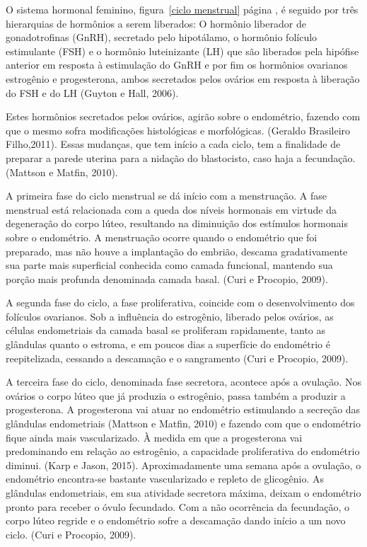 \documentclass[12pt]{article} %
\begin{document}
O sistema hormonal feminino, figura~\ref{ciclo menstrual} página
\pageref{ciclo menstrual}, é seguido por três hierarquias de hormônios
a serem liberados: O hormônio liberador de gonadotrofinas (GnRH),
secretado pelo hipotálamo, o hormônio folículo estimulante (FSH) e o
hormônio luteinizante (LH) que são liberados pela hipófise anterior
em resposta à estimulação do GnRH e por fim os hormônios ovarianos
estrogênio e progesterona, ambos secretados pelos ovários em resposta
à liberação do FSH e do LH (Guyton e Hall, 2006).


Estes hormônios secretados pelos ovários, agirão sobre o endométrio,
fazendo com que o mesmo sofra modificações histológicas e
morfológicas.  (Geraldo Brasileiro Filho,2011).  Essas mudanças, que
tem início a cada ciclo, tem a finalidade de preparar a parede uterina
para a nidação do blastocisto, caso haja a fecundação. (Mattson e
Matfin, 2010).


A primeira fase do ciclo menstrual se dá início com a menstruação. A
fase menstrual está relacionada com a queda dos níveis hormonais em
virtude da degeneração do corpo lúteo, resultando na diminuição dos
estímulos hormonais sobre o endométrio. A menstruação ocorre quando o
endométrio que foi preparado, mas não houve a implantação do embrião,
descama gradativamente sua parte mais superficial conhecida como
camada funcional, mantendo sua porção mais profunda denominada camada
basal. (Curi e Procopio, 2009).

A segunda fase do ciclo, a fase proliferativa, coincide com o
desenvolvimento dos folículos ovarianos. Sob a influência do
estrogênio, liberado pelos ovários, as células endometriais da camada
basal se proliferam rapidamente, tanto as glândulas quanto o estroma,
e em poucos dias a superfície do endométrio é reepitelizada, cessando
a descamação e o sangramento (Curi e Procopio, 2009).


A terceira fase do ciclo, denominada fase secretora, acontece após a
ovulação. Nos ovários o corpo lúteo que já produzia o estrogênio,
passa também a produzir a progesterona.  A progesterona vai atuar no
endométrio estimulando a secreção das glândulas endometriais (Mattson
e Matfin, 2010) e fazendo com que o endométrio fique ainda mais
vascularizado. À medida em que a progesterona vai predominando em
relação ao estrogênio, a capacidade proliferativa do endométrio
diminui. (Karp e Jason, 2015).  Aproximadamente uma semana após a
ovulação, o endométrio encontra-se bastante vascularizado e repleto de
glicogênio. As glândulas endometriais, em sua atividade secretora
máxima, deixam o endométrio pronto para receber o óvulo fecundado. Com
a não ocorrência da fecundação, o corpo lúteo regride e o endométrio
sofre a descamação dando início a um novo ciclo.  (Curi e Procopio,
2009).
\end{document}
